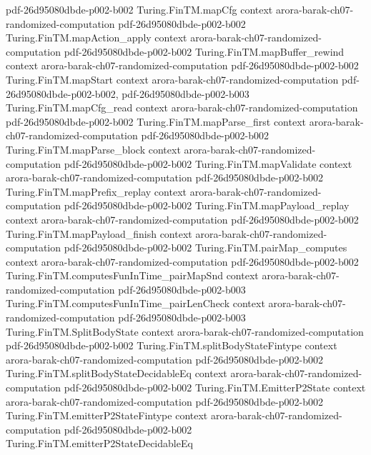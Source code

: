\begin{theorem}
  {pdf-26d95080dbde-p002-b002}
\proofstep
  {Turing.FinTM.mapCfg}
  {context}
  {arora-barak-ch07-randomized-computation}
  {pdf-26d95080dbde-p002-b002}
\proofstep
  {Turing.FinTM.mapAction_apply}
  {context}
  {arora-barak-ch07-randomized-computation}
  {pdf-26d95080dbde-p002-b002}
\proofstep
  {Turing.FinTM.mapBuffer_rewind}
  {context}
  {arora-barak-ch07-randomized-computation}
  {pdf-26d95080dbde-p002-b002}
\proofstep
  {Turing.FinTM.mapStart}
  {context}
  {arora-barak-ch07-randomized-computation}
  {pdf-26d95080dbde-p002-b002,
    pdf-26d95080dbde-p002-b003}
\proofstep
  {Turing.FinTM.mapCfg_read}
  {context}
  {arora-barak-ch07-randomized-computation}
  {pdf-26d95080dbde-p002-b002}
\proofstep
  {Turing.FinTM.mapParse_first}
  {context}
  {arora-barak-ch07-randomized-computation}
  {pdf-26d95080dbde-p002-b002}
\proofstep
  {Turing.FinTM.mapParse_block}
  {context}
  {arora-barak-ch07-randomized-computation}
  {pdf-26d95080dbde-p002-b002}
\proofstep
  {Turing.FinTM.mapValidate}
  {context}
  {arora-barak-ch07-randomized-computation}
  {pdf-26d95080dbde-p002-b002}
\proofstep
  {Turing.FinTM.mapPrefix_replay}
  {context}
  {arora-barak-ch07-randomized-computation}
  {pdf-26d95080dbde-p002-b002}
\proofstep
  {Turing.FinTM.mapPayload_replay}
  {context}
  {arora-barak-ch07-randomized-computation}
  {pdf-26d95080dbde-p002-b002}
\proofstep
  {Turing.FinTM.mapPayload_finish}
  {context}
  {arora-barak-ch07-randomized-computation}
  {pdf-26d95080dbde-p002-b002}
\proofstep
  {Turing.FinTM.pairMap_computes}
  {context}
  {arora-barak-ch07-randomized-computation}
  {pdf-26d95080dbde-p002-b002}
\proofstep
  {Turing.FinTM.computesFunInTime_pairMapSnd}
  {context}
  {arora-barak-ch07-randomized-computation}
  {pdf-26d95080dbde-p002-b003}
\proofstep
  {Turing.FinTM.computesFunInTime_pairLenCheck}
  {context}
  {arora-barak-ch07-randomized-computation}
  {pdf-26d95080dbde-p002-b003}
\proofstep
  {Turing.FinTM.SplitBodyState}
  {context}
  {arora-barak-ch07-randomized-computation}
  {pdf-26d95080dbde-p002-b002}
\proofstep
  {Turing.FinTM.splitBodyStateFintype}
  {context}
  {arora-barak-ch07-randomized-computation}
  {pdf-26d95080dbde-p002-b002}
\proofstep
  {Turing.FinTM.splitBodyStateDecidableEq}
  {context}
  {arora-barak-ch07-randomized-computation}
  {pdf-26d95080dbde-p002-b002}
\proofstep
  {Turing.FinTM.EmitterP2State}
  {context}
  {arora-barak-ch07-randomized-computation}
  {pdf-26d95080dbde-p002-b002}
\proofstep
  {Turing.FinTM.emitterP2StateFintype}
  {context}
  {arora-barak-ch07-randomized-computation}
  {pdf-26d95080dbde-p002-b002}
\proofstep
  {Turing.FinTM.emitterP2StateDecidableEq}

\end{theorem}
